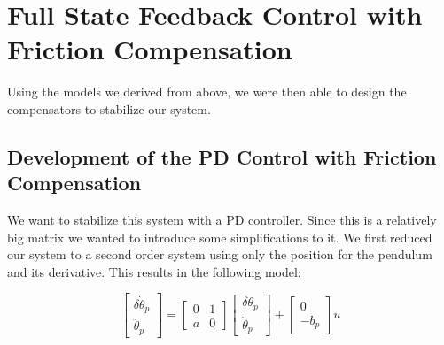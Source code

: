 




\section{Full State Feedback Control with Friction Compensation}
Using the models we derived from above, we were then able to design the compensators to stabilize our system.
\subsection{Development of the PD Control with Friction Compensation}
We want to stabilize this system with a PD controller. Since this is a relatively big matrix we wanted to introduce some simplifications to it. We first reduced our system to a second order system using only the position for the pendulum and its derivative. This results in the following model:

$$
\begin{bmatrix}
\delta\dot\theta_p\\
\ddot\theta_p
\end{bmatrix}
=
\begin{bmatrix}
0 & 1\\
a & 0
\end{bmatrix}
\begin{bmatrix}
\delta\theta_p\\
\dot\theta_p
\end{bmatrix}
+
\begin{bmatrix}
0\\
-b_p
\end{bmatrix}
u$$

